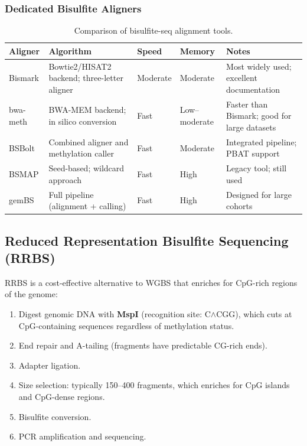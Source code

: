 \subsubsection{Dedicated Bisulfite Aligners}

\begin{table}[htbp]
\centering
\caption{Comparison of bisulfite-seq alignment tools.}
\label{tab:methylation:aligners}
\small
\begin{tabularx}{\textwidth}{l X l l l}
\toprule
\textbf{Aligner} & \textbf{Algorithm} & \textbf{Speed} & \textbf{Memory} & \textbf{Notes} \\
\midrule
Bismark & Bowtie2/HISAT2 backend; three-letter aligner & Moderate & Moderate & Most widely used; excellent documentation \\
\addlinespace
bwa-meth & BWA-MEM backend; in silico conversion & Fast & Low--moderate & Faster than Bismark; good for large datasets \\
\addlinespace
BSBolt & Combined aligner and methylation caller & Fast & Moderate & Integrated pipeline; PBAT support \\
\addlinespace
BSMAP & Seed-based; wildcard approach & Fast & High & Legacy tool; still used \\
\addlinespace
gemBS & Full pipeline (alignment + calling) & Fast & High & Designed for large cohorts \\
\bottomrule
\end{tabularx}
\end{table}

\subsection{Reduced Representation Bisulfite Sequencing (RRBS)}
\label{subsec:methylation:rrbs}

RRBS is a cost-effective alternative to WGBS that enriches for CpG-rich regions of the genome:

\begin{protocolbox}[title={RRBS Protocol}]
\begin{enumerate}[itemsep=1pt]
  \item Digest genomic DNA with \textbf{MspI} (recognition site: C$\wedge$CGG), which cuts at CpG-containing sequences regardless of methylation status.
  \item End repair and A-tailing (fragments have predictable CG-rich ends).
  \item Adapter ligation.
  \item Size selection: typically 150--400\basepair{} fragments, which enriches for CpG islands and CpG-dense regions.
  \item Bisulfite conversion.
  \item PCR amplification and sequencing.
\end{enumerate}
\end{protocolbox}

